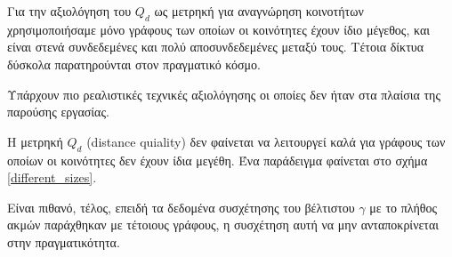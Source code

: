 \documentclass[12pt, letterpaper]{article}
\begin{document}
Για την αξιολόγηση του $Q_d$ ως μετρηκή για αναγνώρηση κοινοτήτων χρησιμοποιήσαμε 
μόνο γράφους των οποίων οι κοινότητες έχουν ίδιο μέγεθος, και 
είναι στενά συνδεδεμένες και πολύ αποσυνδεδεμένες μεταξύ τους. 
Τέτοια δίκτυα δύσκολα παρατηρούνται στον πραγματικό κόσμο. 

Υπάρχουν πιο ρεαλιστικές τεχνικές αξιολόγησης \cite{benchmark_realistic} οι οποίες δεν 
ήταν στα πλαίσια της παρούσης εργασίας. 


Η μετρηκή $Q_d$ (\textlatin{distance quiality}) δεν φαίνεται να λειτουργεί καλά για γράφους
των οποίων οι κοινότητες δεν έχουν ίδια μεγέθη. 
Ένα παράδειγμα φαίνεται στο σχήμα \ref{different_sizes}.  

Είναι πιθανό, τέλος, επειδή τα δεδομένα συσχέτησης του βέλτιστου $\gamma$ με το πλήθος 
ακμών παράχθηκαν με τέτοιους γράφους, η συσχέτηση αυτή να μην ανταποκρίνεται στην πραγματικότητα. 
\end{document}
